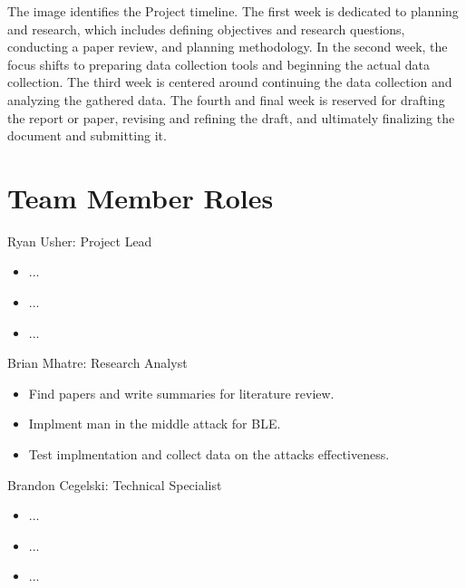 \documentclass{article}
\begin{document}
    The image identifies the Project timeline. The first week is dedicated to planning and research, which includes defining objectives and research questions, conducting a paper review, and planning methodology. In the second week, the focus shifts to preparing data collection tools and beginning the actual data collection. The third week is centered around continuing the data collection and analyzing the gathered data. The fourth and final week is reserved for drafting the report or paper, revising and refining the draft, and ultimately finalizing the document and submitting it.
\section{Team Member Roles}

Ryan Usher: Project Lead
\begin{itemize}
    \item ...
    \item ...
    \item ...
\end{itemize}

Brian Mhatre: Research Analyst
\begin{itemize}
    \item Find papers and write summaries for literature review.
    \item Implment man in the middle attack for BLE.
    \item Test implmentation and collect data on the attacks effectiveness.
\end{itemize}

Brandon Cegelski: Technical Specialist
\begin{itemize}
    \item ...
    \item ...
    \item ...
\end{itemize}
\end{document}
